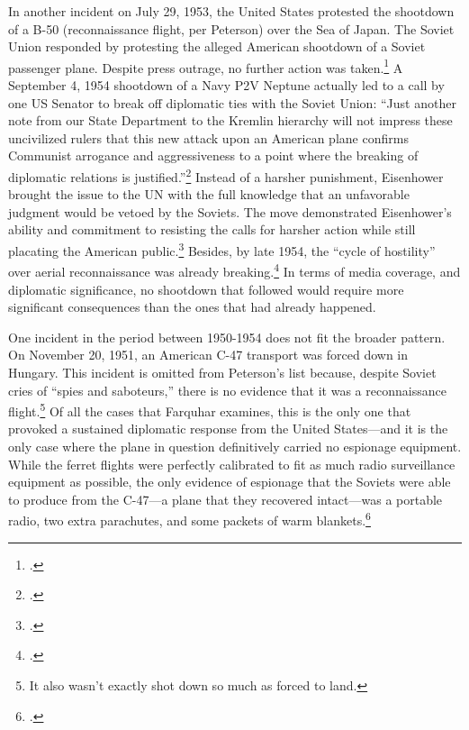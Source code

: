\documentclass[14pt]{extarticle}
\begin{document}
In another incident on July 29, 1953, the United States protested the shootdown of a B-50 (reconnaissance flight, per Peterson) over the Sea of Japan. The Soviet Union responded by protesting the alleged American shootdown of a Soviet passenger plane. Despite press outrage, no further action was taken.\footcite[p.~47]{farquhar_aerial_2015} A September 4, 1954 shootdown of a Navy P2V Neptune actually led to a call by one US Senator to break off diplomatic ties with the Soviet Union: \enquote{Just another note from our State Department to the Kremlin hierarchy will not impress these uncivilized rulers \textelp{} that this new attack upon an American plane confirms Communist arrogance and aggressiveness to a point where the breaking of diplomatic relations is justified.}\footcite{the_associated_press_ending_1954} Instead of a harsher punishment, Eisenhower brought the issue to the UN with the full knowledge that an unfavorable judgment would be vetoed by the Soviets. The move demonstrated Eisenhower's ability and commitment to resisting the calls for harsher action while still placating the American public.\footcite[p.~47]{farquhar_aerial_2015} Besides, by late 1954, the \enquote{cycle of hostility} over aerial reconnaissance was already breaking.\footcite[p.~49]{farquhar_aerial_2015} In terms of media coverage, and diplomatic significance, no shootdown that followed would require more significant consequences than the ones that had already happened.

One incident in the period between 1950-1954 does not fit the broader pattern. On November 20, 1951, an American C-47 transport was forced down in Hungary. This incident is omitted from Peterson's list because, despite Soviet cries of \enquote{spies and saboteurs,} there is no evidence that it was a reconnaissance flight.\footnote{It also wasn't exactly shot down so much as forced to land.} Of all the cases that Farquhar examines, this is the only one that provoked a sustained diplomatic response from the United States---and it is the only case where the plane in question definitively carried no espionage equipment. While the ferret flights were perfectly calibrated to fit as much radio surveillance equipment as possible, the only evidence of espionage that the Soviets were able to produce from the C-47---a plane that they recovered intact---was a portable radio, two extra parachutes, and some packets of warm blankets.\footcite{the_united_press_soviet_1951}
\end{document}
